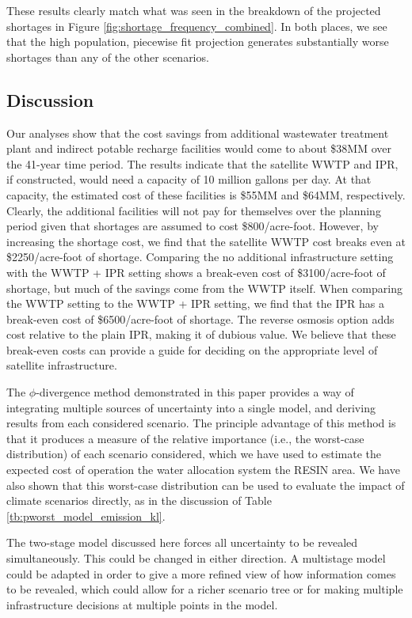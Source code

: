 \documentclass[opre,nonblindrev]{informs3} %
\begin{document}
These results clearly match what was seen in the breakdown of the projected shortages in Figure \ref{fig:shortage_frequency_combined}.
In both places, we see that the high population, piecewise fit projection generates substantially worse shortages than any of the other scenarios.


\subsection{Discussion}

Our analyses show that the cost savings from additional wastewater treatment plant and indirect potable recharge facilities would come to about \$38MM over the 41-year time period.
The results indicate that the satellite WWTP and IPR, if constructed, would need a capacity of 10 million gallons per day.
At that capacity, the estimated cost of these facilities is \$55MM and \$64MM, respectively.
Clearly, the additional facilities will not pay for themselves over the planning period given that shortages are assumed to cost \$800/acre-foot.
However, by increasing the shortage cost, we find that the satellite WWTP cost breaks even at \$2250/acre-foot of shortage.
Comparing the no additional infrastructure setting with the WWTP + IPR setting shows a break-even cost of \$3100/acre-foot of shortage, but much of the savings come from the WWTP itself.
When comparing the WWTP setting to the WWTP + IPR setting, we find that the IPR has a break-even cost of \$6500/acre-foot of shortage.
The reverse osmosis option adds cost relative to the plain IPR, making it of dubious value.
We believe that these break-even costs can provide a guide for deciding on the appropriate level of satellite infrastructure.

The $\phi$-divergence method demonstrated in this paper provides a way of integrating multiple sources of uncertainty into a single model, and deriving results from each considered scenario.
The principle advantage of this method is that it produces a measure of the relative importance (i.e., the worst-case distribution) of each scenario considered, which we have used to estimate the expected cost of operation the water allocation system the RESIN area.
We have also shown that this worst-case distribution can be used to evaluate the impact of climate scenarios directly, as in the discussion of Table \ref{tb:pworst_model_emission_kl}.

The two-stage model discussed here forces all uncertainty to be revealed simultaneously.
This could be changed in either direction.
A multistage model could be adapted in order to give a more refined view of how information comes to be revealed, which could allow for a richer scenario tree or for making multiple infrastructure decisions at multiple points in the model.
\end{document}
